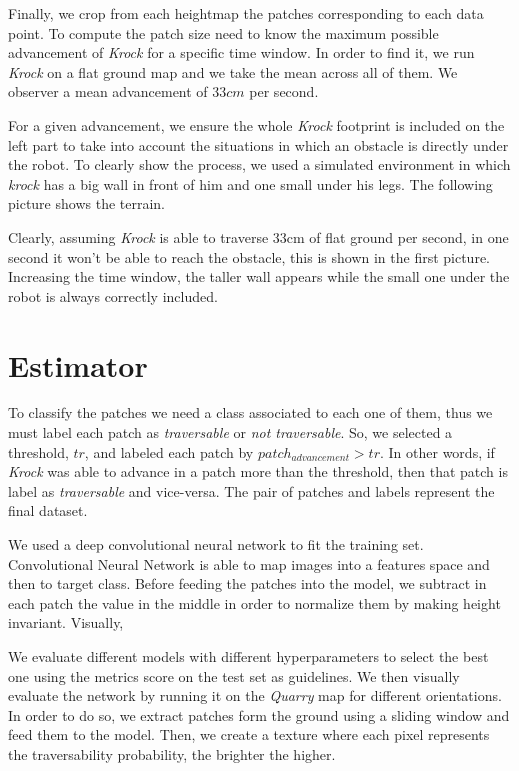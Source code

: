 \documentclass[../document.tex]{subfiles}
\begin{document}
Finally, we crop from each heightmap the patches corresponding to each data point. To compute the patch size need to know the maximum possible advancement of \emph{Krock} for a specific time window. In order to find it, we run \emph{Krock} on a flat ground map and we take the mean across all of them. We observer a mean advancement of $33cm$ per second.

For a given advancement, we ensure the whole \emph{Krock} footprint is included on the left part to take into account the situations in which an obstacle is directly under the robot. To clearly show the process, we used a simulated environment in which \emph{krock} has a big wall in front of him and one small under his legs. The following picture shows the terrain.


Clearly, assuming \emph{Krock} is able to traverse $33$cm of flat ground per second, in one second it won't be able to reach the obstacle, this is shown in the first picture. Increasing the time window, the taller wall appears while the small one under the robot is always correctly included.



\section{Estimator}
To classify the patches we need a class associated to each one of them, thus we must label each patch as \emph{traversable} or \emph{not traversable}. So, we selected a threshold, $tr$, and labeled each patch by $patch_{advancement} > tr$. 
In other words, if \emph{Krock} was able to advance in a patch more than the threshold, then that patch is label as \emph{traversable} and vice-versa. The pair of patches and labels represent the final dataset.

We used a deep convolutional neural network to fit the training set. Convolutional Neural Network is able to map images into a features space and then to target class. 
Before feeding the patches into the model, we subtract in each patch the value in the middle in order to normalize them by making height invariant. Visually,

We evaluate different models with different hyperparameters to select the best one using the metrics score on the test set as guidelines. We then visually evaluate the network by running it on the \emph{Quarry} map for different orientations. In order to do so, we extract patches form the ground using a sliding window and feed them to the model. Then, we create a texture where each pixel represents the traversability probability, the brighter the higher.
\end{document}
